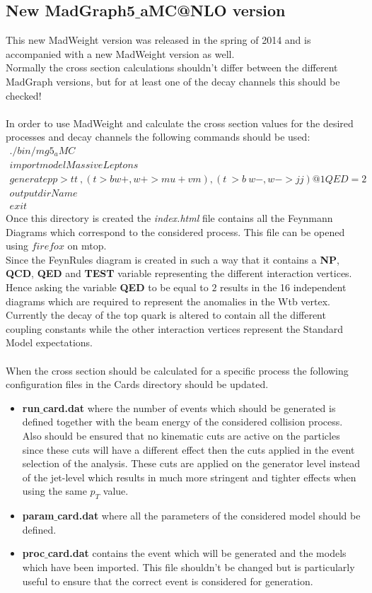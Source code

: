 \subsection{New MadGraph5$\_$aMC@NLO version}
This new MadWeight version was released in the spring of 2014 and is accompanied with a new MadWeight version as well.\\
Normally the cross section calculations shouldn't differ between the different MadGraph versions, but for at least one of the decay channels this should be checked!\\
\\
In order to use MadWeight and calculate the cross section values for the desired processes and decay channels the following commands should be used:
\begin{eqnarray}
 ./bin/mg5_aMC \\
 import model MassiveLeptons \\
 generate p p > t t~ , ( t > b w+ , w+ > mu+ vm ) , ( t~ > b~ w- , w- > j j ) @1 QED = 2 \\
 output dirName \\
 exit
\end{eqnarray}
Once this directory is created the \textit{index.html} file contains all the Feynmann Diagrams which correspond to the considered process. This file can be opened using $firefox$ on mtop.\\
Since the FeynRules diagram is created in such a way that it contains a \textbf{NP}, \textbf{QCD}, \textbf{QED} and \textbf{TEST} variable representing the different interaction vertices. Hence asking the variable \textbf{QED} to be equal to $2$ results in the 16 independent diagrams which are required to represent the anomalies in the Wtb vertex. Currently the decay of the top quark is altered to contain all the different coupling constants while the other interaction vertices represent the Standard Model expectations.\\
\\
When the cross section should be calculated for a specific process the following configuration files in the Cards directory should be updated.
\begin{itemize}
 \item \textbf{run$\_$card.dat} where the number of events which should be generated is defined together with the beam energy of the considered collision process. Also should be ensured that no kinematic cuts are active on the particles since these cuts will have a different effect then the cuts applied in the event selection of the analysis. These cuts are applied on the generator level instead of the jet-level which results in much more stringent and tighter effects when using the same $p_{T}$ value.
 \item \textbf{param$\_$card.dat} where all the parameters of the considered model should be defined.
 \item \textbf{proc$\_$card.dat} contains the event which will be generated and the models which have been imported. This file shouldn't be changed but is particularly useful to ensure that the correct event is considered for generation.
\end{itemize}

